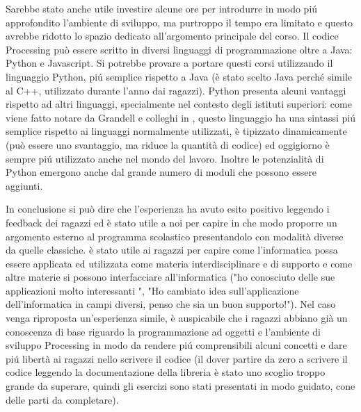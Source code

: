 Sarebbe stato anche utile investire alcune ore per introdurre in modo piú approfondito l'ambiente di sviluppo, ma purtroppo il tempo era limitato e questo avrebbe ridotto lo spazio dedicato all'argomento principale del corso. Il codice Processing può essere scritto in diversi linguaggi di programmazione oltre a Java: Python e Javascript. Si potrebbe provare a portare questi corsi utilizzando il linguaggio Python, piú semplice rispetto a Java (è stato scelto Java perché simile al C++, utilizzato durante l'anno dai ragazzi). Python presenta alcuni vantaggi rispetto ad altri linguaggi, specialmente nel contesto degli istituti superiori: come viene fatto notare da Grandell e colleghi in \cite{python_high_school}, questo linguaggio ha una sintassi piú semplice rispetto ai linguaggi normalmente utilizzati, è tipizzato dinamicamente (può essere uno svantaggio, ma riduce la quantità di codice) ed oggigiorno è sempre piú utilizzato anche nel mondo del lavoro. Inoltre le potenzialità di Python emergono anche dal grande numero di moduli che possono essere aggiunti. 

In conclusione si può dire che l'esperienza ha avuto esito positivo leggendo i feedback dei ragazzi ed è stato utile a noi per capire in che modo proporre un argomento esterno al programma scolastico presentandolo con modalità diverse da quelle classiche. è stato utile ai ragazzi per capire come l'informatica possa essere applicata ed utilizzata come materia interdisciplinare e di supporto e come altre materie si possono interfacciare all'informatica ("ho conosciuto delle sue applicazioni molto interessanti ", "Ho cambiato idea sull'applicazione dell'informatica in campi diversi, penso che sia un buon supporto!"). Nel caso venga riproposta un'esperienza simile, è auspicabile che i ragazzi abbiano già un conoscenza di base riguardo la programmazione ad oggetti e l'ambiente di sviluppo Processing in modo da rendere piú comprensibili alcuni concetti e dare piú libertà ai ragazzi nello scrivere il codice (il dover partire da zero a scrivere il codice leggendo la documentazione della libreria è stato uno scoglio troppo grande da superare, quindi gli esercizi sono stati presentati in modo guidato, cone delle parti da completare).
